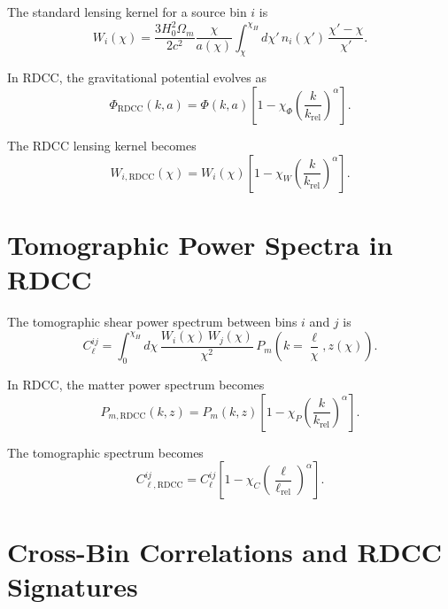 \documentclass[11pt,a4paper]{article}
\begin{document}
The standard lensing kernel for a source bin $i$ is
\begin{equation}
    W_{i}(\chi)
    = \frac{3H_{0}^{2}\Omega_{m}}{2c^{2}}
      \frac{\chi}{a(\chi)}
      \int_{\chi}^{\chi_{H}} d\chi'\,
      n_{i}(\chi')\,
      \frac{\chi' - \chi}{\chi'}.
\end{equation}

In RDCC, the gravitational potential evolves as
\begin{equation}
    \Phi_{\mathrm{RDCC}}(k,a)
    = \Phi(k,a)
      \left[
        1 - \chi_{\Phi}
        \left(\frac{k}{k_{\mathrm{rel}}}\right)^{\alpha}
      \right].
\end{equation}

The RDCC lensing kernel becomes
\begin{equation}
    W_{i,\mathrm{RDCC}}(\chi)
    = W_{i}(\chi)
      \left[
        1 - \chi_{W}
        \left(\frac{k}{k_{\mathrm{rel}}}\right)^{\alpha}
      \right].
\end{equation}
\section{Tomographic Power Spectra in RDCC}

The tomographic shear power spectrum between bins $i$ and $j$ is
\begin{equation}
    C_{\ell}^{ij}
    = \int_{0}^{\chi_{H}}
      d\chi\,
      \frac{W_{i}(\chi)\, W_{j}(\chi)}{\chi^{2}}\,
      P_{m}\left(k=\frac{\ell}{\chi},z(\chi)\right).
\end{equation}

In RDCC, the matter power spectrum becomes
\begin{equation}
    P_{m,\mathrm{RDCC}}(k,z)
    = P_{m}(k,z)
      \left[
        1 - \chi_{P}
        \left(\frac{k}{k_{\mathrm{rel}}}\right)^{\alpha}
      \right].
\end{equation}

The tomographic spectrum becomes
\begin{equation}
    C_{\ell,\mathrm{RDCC}}^{ij}
    = C_{\ell}^{ij}
      \left[
        1 - \chi_{C}
        \left(\frac{\ell}{\ell_{\mathrm{rel}}}\right)^{\alpha}
      \right].
\end{equation}
\section{Cross-Bin Correlations and RDCC Signatures}
\end{document}
